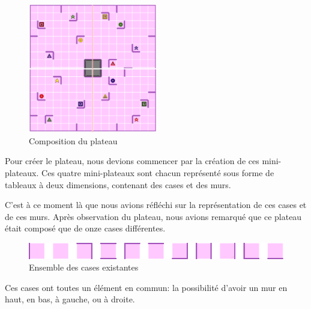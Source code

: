 \documentclass[a4paper, 12pt]{article}
\begin{document}
            \begin{figure}[H]
            	\centering\includegraphics[width=0.5\textwidth]{images/plateauDecoupe.png}
            	\caption{Composition du plateau}
            \end{figure}
            
            Pour créer le plateau, nous devions commencer par la création de ces mini-plateaux. Ces quatre mini-plateaux sont chacun représenté sous forme de tableaux à deux dimensions, contenant des cases et des murs. 
            
            C'est à ce moment là que nous avions réfléchi sur la représentation de ces cases et de ces murs. Après observation du plateau, nous avions remarqué que ce plateau était composé que de onze cases différentes.
            
            \begin{figure}[H]
            	\centering\includegraphics[scale=0.60]{images/liste_cases.png}
            	\caption{Ensemble des cases existantes}
            \end{figure}
            
            Ces cases ont toutes un élément en commun: la possibilité d'avoir un mur en haut, en bas, à gauche, ou à droite.
    
            \vspace{0.5cm}
            \begin{center}
            \end{center}  
            \vspace{0.5cm}
            
\end{document}
